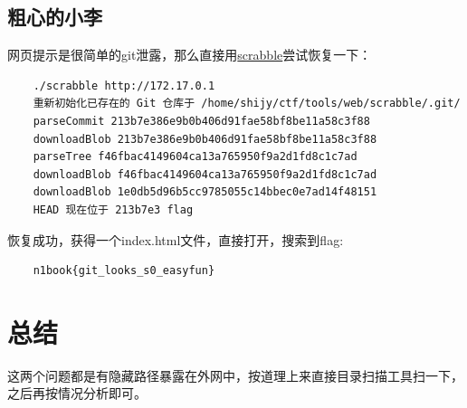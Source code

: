\newpage

\subsection{粗心的小李}
网页提示是很简单的git泄露，那么直接用\href{https://github.com/denny0223/scrabble}{scrabble}尝试恢复一下：
\begin{lstlisting}
    ./scrabble http://172.17.0.1
    重新初始化已存在的 Git 仓库于 /home/shijy/ctf/tools/web/scrabble/.git/
    parseCommit 213b7e386e9b0b406d91fae58bf8be11a58c3f88
    downloadBlob 213b7e386e9b0b406d91fae58bf8be11a58c3f88
    parseTree f46fbac4149604ca13a765950f9a2d1fd8c1c7ad
    downloadBlob f46fbac4149604ca13a765950f9a2d1fd8c1c7ad
    downloadBlob 1e0db5d96b5cc9785055c14bbec0e7ad14f48151
    HEAD 现在位于 213b7e3 flag
\end{lstlisting}

恢复成功，获得一个index.html文件，直接打开，搜索到flag:
\begin{lstlisting}
    n1book{git_looks_s0_easyfun}
\end{lstlisting}

\section{总结}
这两个问题都是有隐藏路径暴露在外网中，按道理上来直接目录扫描工具扫一下，之后再按情况分析即可。